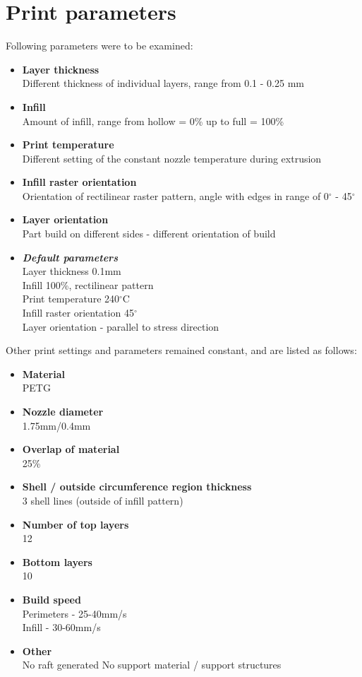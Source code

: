 \documentclass[a4paper, twoside, 11pt]{report}
\begin{document}
\section{Print parameters}
Following parameters were to be examined:
\begin{itemize}
\item \textbf{Layer thickness}\\
	Different thickness of individual layers, range from 0.1 - 0.25 mm
\item \textbf{Infill}\\
	Amount of infill, range from hollow = 0\% up to full = 100\%
\item \textbf{Print temperature}\\
	Different setting of the constant nozzle temperature during extrusion
\item \textbf{Infill raster orientation}\\
	Orientation of rectilinear raster pattern, angle with edges in range of 0$^{\circ}$ - 45$^{\circ}$
\item \textbf{Layer orientation}\\
	Part build on different sides - different orientation of build
\item \textbf{\textit{Default parameters}}\\
Layer thickness 0.1mm\\
Infill 100\%, rectilinear pattern\\
Print temperature 240$^{\circ}$C\\
Infill raster orientation 45$^{\circ}$\\
Layer orientation - parallel to stress direction
\end{itemize}
\bigskip
%
Other print settings and parameters remained constant, and are listed as follows:
\begin{itemize}
\item \textbf{Material}\\
	PETG
\item \textbf{Nozzle diameter}\\
	1.75mm/0.4mm
\item \textbf{Overlap of material}\\
	25\%
\item \textbf{Shell / outside circumference region thickness}\\
	3 shell lines (outside of infill pattern)
\item \textbf{Number of top layers}\\
	12
\item \textbf{Bottom layers}\\
	10
\item \textbf{Build speed}\\
	Perimeters - 25-40mm/s\\
	Infill - 30-60mm/s
\item \textbf{Other}\\
	No raft generated
	No support material / support structures
\end{itemize}
\end{document}
